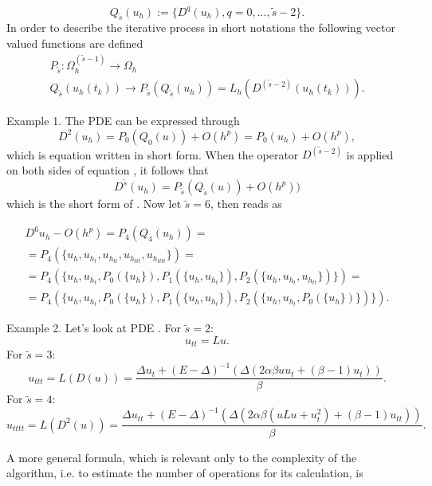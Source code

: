 \documentclass[11pt,a4paper,twoside]{article}
\begin{document}
\begin{equation}
Q_{\tilde s}(u_h) := \{ D^{q}(u_h), q = 0, ... , \tilde s - 2 \}.
\end{equation}
In order to describe the iterative process in short notations the following vector valued functions are defined
\begin{align*} 
P_{\tilde s} : \Omega_h^{(\tilde s - 1)} \rightarrow \Omega_h
\\ Q_{\tilde s}(u_h(t_k)) \rightarrow P_{\tilde s} (Q_{\tilde s}(u_h) ) = L_h( D^{(\tilde s - 2)} (u_h(t_k)) ).
\end{align*}

Example 1. The PDE  can be expressed through 
\begin{equation}\label{example}
D^{2}(u_h) = P_0(Q_0(u)) + O(h^p) = P_0(u_h) + O(h^p),
\end{equation}
which is equation  written in short form. When the operator $D^{(\tilde s -2)}$ is applied on both sides of equation , it follows that
\begin{equation}\label{DPeq}
D^{\tilde s}(u_h) = P_{\tilde s}(Q_{\tilde s}(u)) + O(h^p))
\end{equation}
which is the short form of . Now let $\tilde s = 6$, then  reads as

\begin{align*} 
D^6 u_h - O(h^p) = P_4(Q_4(u_h)) =
\\
= P_4(\{u_{ h}, u_{ h_{t} }, u_{ h_{tt} }, u_{ h_{ttt} }, u_{ h_{tttt} } \}) = 
\\
= P_4(\{u_{ h}, u_{ h_{t} }, P_0(\{u_h\}),  P_1( \{ u_h, u_{ h_{t} } \} ), P_2( \{ u_h, u_{ h_{t} }, u_{ h_{tt} } \} )  \}) = 
\\ 
= P_4(\{u_{ h}, u_{ h_{t} }, P_0(\{u_h\}),  P_1( \{ u_h, u_{ h_{t} } \} ), P_2( \{ u_h, u_{ h_{t} },  P_0( \{ u_h \} ) \} )  \}).
\end{align*}

Example 2. Let's look at PDE . For $\tilde s = 2$:
$$
u_{tt} = Lu.
$$
For $\tilde s = 3$:
$$
u_{ttt} = L(D(u)) = \frac{ \Delta u_t + (E - \Delta)^{-1}           ( \Delta (2 \alpha \beta u u_t  +                          (\beta -1)u_t) )  }{\beta}.
$$
For $\tilde s = 4$:
$$
u_{tttt} = L(D^2(u)) = \frac{ \Delta u_{tt} + (E - \Delta)^{-1}( \Delta (2 \alpha \beta ( u Lu +  u_t^2 )   + (\beta -1) u_{tt} ) )  }{\beta}.
$$

A more general formula, which is relevant only to the complexity of the algorithm, i.e. to estimate the number of operations for its calculation, is
\end{document}
